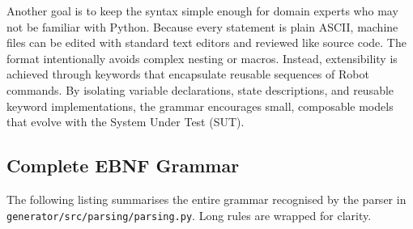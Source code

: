 Another goal is to keep the syntax simple enough for domain experts who may not be familiar with Python. Because every statement is plain ASCII, machine files can be edited with standard text editors and reviewed like source code. The format intentionally avoids complex nesting or macros. Instead, extensibility is achieved through keywords that encapsulate reusable sequences of Robot commands. By isolating variable declarations, state descriptions, and reusable keyword implementations, the grammar encourages small, composable models that evolve with the System Under Test (SUT).

\subsection{Complete EBNF Grammar}

The following listing summarises the entire grammar recognised by the parser in
\texttt{generator/src/parsing/parsing.py}. Long rules are wrapped for
clarity.


